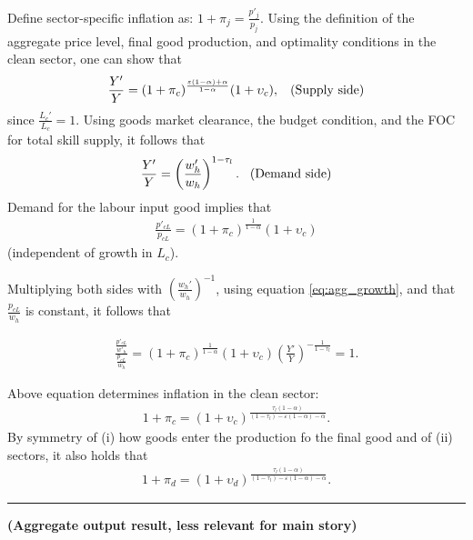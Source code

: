 Define sector-specific inflation as: $1+\pi_{j}=\frac{p'_j}{p_j}$.
Using the definition of the aggregate price level, final good production, and optimality conditions in the clean sector, one can show that 
\begin{align}\label{eq:agg_supply}
\frac{Y'}{Y}= (1+\pi_c)^{\frac{\varepsilon(1-\alpha)+\alpha}{1-\alpha}}(1+\upsilon_{c}), \hspace{3mm} \text{(Supply side)}
\end{align}
since $\frac{L_{c}'}{L_c}=1$.
Using goods market clearance, the budget condition, and the FOC for total skill supply, it follows that 
\begin{align}\label{eq:agg_demand}
\frac{Y'}{Y}= \left(\frac{w'_h}{w_h}\right)^{1-\tau_l}. \hspace{3mm} \text{(Demand side)}
\end{align}
Demand for the labour input good implies that 
\begin{align}\label{eq:labour income}
\frac{p'_{cL}}{p_{cL}}= (1+\pi_c)^\frac{1}{1-\alpha}(1+\upsilon_{c})
\end{align}
(independent of growth in $L_c$).

Multiplying both sides with $\left(\frac{w_h'}{w_h}\right)^{-1}$, using equation \ref{eq:agg_growth}, and that $\frac{p_{cL}}{w_h}$ is constant, it follows that 

\begin{align}
		\frac{\frac{p'_{cL}}{w'_h}}{\frac{p_{cL}}{w_h}}= (1+\pi_c)^\frac{1}{1-\alpha}(1+\upsilon_{c})\left(\frac{Y'}{Y}\right)^{-\frac{1}{1-\tau_l}}=1.
\end{align}

Above equation determines inflation in the clean sector:
\begin{align}\label{eq:inf_c}
1+\pi_c=(1+\upsilon_{c})^{\frac{\tau_l(1-\alpha)}{(1-\tau_l)-\varepsilon(1-\alpha)-\alpha}}.
\end{align}
By symmetry of (i) how goods enter the production fo the final good and of (ii) sectors, it also holds that 
\begin{align}\label{eq:inf_d}
1+\pi_d=(1+\upsilon_{d})^{\frac{\tau_l(1-\alpha)}{(1-\tau_l)-\varepsilon(1-\alpha)-\alpha}}.
\end{align}


\noindent\rule[1ex]{\textwidth}{1pt}

\noindent \textbf{(Aggregate output result, less relevant for main story)}

